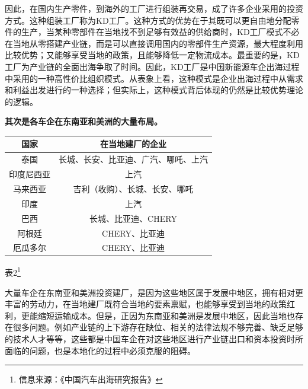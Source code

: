 \documentclass[a4paper, 10pt]{article}
\begin{document}
因此，在国内生产零件，到海外的工厂进行组装再交易，成了许多企业采用的投资方式。这种组装工厂称为KD工厂。这种方式的优势在于其既可以更自由地分配零件的生产，当某种零部件在当地找不到足够有效益的供给商时，KD工厂模式不必在当地从零搭建产业链，而是可以直接调用国内的零部件生产资源，最大程度利用比较优势；又能够享受当地的政策，且能够降低一定物流成本。最重要的是，KD工厂为产业链的全面出海争取了时间。因此，KD工厂是中国新能源车企出海过程中采用的一种高性价比组织模式。从表象上看，这种模式是企业出海过程中从需求和利益出发进行的一种选择；但实际上，这种模式背后体现的仍然是比较优势理论的逻辑。

    \textbf{其次是各车企在东南亚和美洲的大量布局。}

    \vspace{10pt}
    \begin{center}
      \begin{tabular}{|c|c|}
        \hline
        国家 & 在当地建厂的企业\\
        \hline
        泰国 & 长城、长安、比亚迪、广汽、哪吒、上汽\\
        \hline
        印度尼西亚 & 上汽\\
        \hline
        马来西亚 & 吉利（收购）、长城、长安、哪吒\\
        \hline
        印度 & 上汽\\
        \hline
        巴西 & 长城、比亚迪、CHERY\\
        \hline
        阿根廷 & CHERY、比亚迪\\
        \hline
        厄瓜多尔 & CHERY、比亚迪\\
        \hline
      \end{tabular}

      \vspace{10pt}

表2\footnote{信息来源：《中国汽车出海研究报告》}

    \end{center}



    \vspace{10pt}

  大量车企在东南亚和美洲投资建厂，是因为这些地区属于发展中地区，拥有相对更丰富的劳动力，在当地建厂既符合当地的要素禀赋，也能够享受到当地的政策红利，更能缩短运输成本。但是，正因为东南亚和美洲是发展中地区，因此当地也存在很多问题。例如产业链的上下游存在缺位、相关的法律法规不够完善、缺乏足够的技术人才等等，这些都是中国车企在对这些地区进行产业链出口和资本投资时所面临的问题，也是本地化的过程中必须克服的阻碍。
\end{document}
